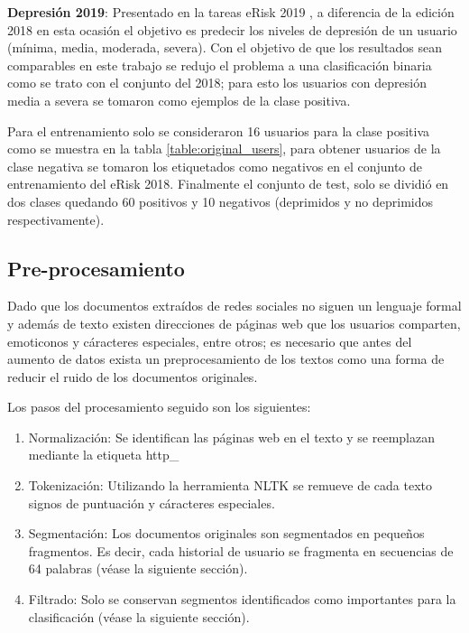 \textbf{Depresión 2019}: Presentado en la tareas eRisk 2019 \cite{Losada2019}, a diferencia de la edición 2018 en esta ocasión el objetivo es predecir los niveles de depresión de un usuario (mínima, media, moderada, severa). Con el objetivo de que los resultados sean comparables en este trabajo se redujo el problema a una clasificación binaria como se trato con el conjunto del 2018; para esto los usuarios con depresión media a severa se tomaron como ejemplos de la clase positiva.

Para el entrenamiento solo se consideraron 16 usuarios para la clase positiva como se muestra en la tabla \ref{table:original_users}, para obtener usuarios de la clase negativa se tomaron los etiquetados como negativos en el conjunto de entrenamiento del eRisk 2018. Finalmente el conjunto de test, solo se dividió en dos clases quedando 60 positivos y 10 negativos (deprimidos y no deprimidos respectivamente).







\subsection{Pre-procesamiento}

Dado que los documentos extraídos de redes sociales no siguen un lenguaje formal y además de texto existen direcciones de páginas web que los usuarios comparten, emoticonos y cáracteres especiales, entre otros; es necesario que antes del aumento de datos exista un preprocesamiento de los textos como una forma de reducir el ruido de los documentos originales.

Los pasos del procesamiento seguido son los siguientes:

 \begin{enumerate}
     \item Normalización: Se identifican las páginas web en el texto y se reemplazan mediante la etiqueta http\_
     \item Tokenización: Utilizando la herramienta NLTK se remueve de cada texto signos de puntuación y cáracteres especiales.
     \item Segmentación: Los documentos originales son segmentados en pequeños fragmentos. Es decir, cada historial de usuario se fragmenta en secuencias de 64 palabras  (véase la siguiente sección). 
     \item Filtrado: Solo se conservan segmentos identificados como importantes para la clasificación (véase la siguiente sección).
 \end{enumerate}



